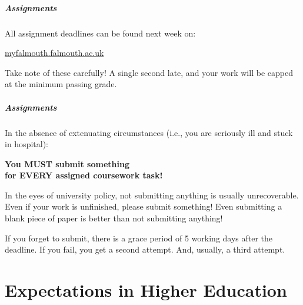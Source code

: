 \begin{frame}
	\frametitle{Assignments}
		
	All assignment deadlines can be found next week on:
	
	\vspace{1em}
	
	\indent \url{myfalmouth.falmouth.ac.uk}
	
	\vspace{1em}
	
	Take note of these carefully! A single second late, and your work will be capped at the minimum passing grade.
	
\end{frame}

\begin{frame}
	\frametitle{Assignments}
		
	In the absence of extenuating circumstances (i.e., you are seriously ill and stuck in hospital):
	
	\begin{Large}
		\begin{center}
			\textbf{You MUST submit something \\ for EVERY assigned coursework task!}
		\end{center}
	\end{Large}
	
	In the eyes of university policy, not submitting anything is usually unrecoverable. Even if your work is unfinished, please submit something! Even submitting a blank piece of paper is better than not submitting anything! 
	
		\vspace{0.5em}
	
	If you forget to submit, there is a grace period of 5 working days after the deadline. If you fail, you get a second attempt. And, usually, a third attempt.
	
\end{frame}


\part{Expectations in Higher Education}
\frame{\partpage}

